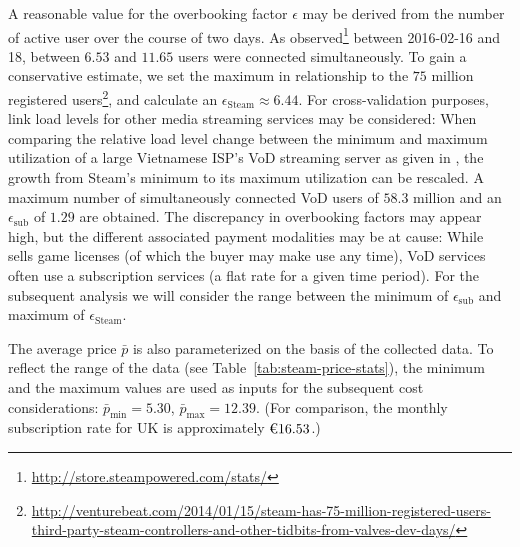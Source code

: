 

A reasonable value for the overbooking factor $\epsilon$ may be derived from the number of active \steam user over the course of two days. As observed\footnote{\url{http://store.steampowered.com/stats/}} between 2016-02-16 and 18, between $6.53$\si{\mega} and $11.65$\si{\mega} users were connected simultaneously. To gain a conservative estimate, we set the maximum in relationship to the $75$ million registered \steam users\footnote{\url{http://venturebeat.com/2014/01/15/steam-has-75-million-registered-users-third-party-steam-controllers-and-other-tidbits-from-valves-dev-days/}}, and calculate an $\epsilon_{\text{Steam}}\approx6.44$. For cross-validation purposes, link load levels for other media streaming services may be considered: When comparing the relative load level change between the minimum and maximum utilization of a large Vietnamese \acrshort{ISP}'s \gls{VoD} streaming server as given in \cite{thanh2012enabling}%
, the growth from Steam's minimum to its maximum utilization can be rescaled. A maximum number of simultaneously connected \gls{VoD} users of $58.3$ million and an $\epsilon_{\text{sub}}$ of $1.29$ are obtained. The discrepancy in overbooking factors may appear high, but the different associated payment modalities may be at cause: While \steam sells game licenses (of which the buyer may make use any time), \gls{VoD} services often use a subscription services (a flat rate for a given time period). For the subsequent analysis we will consider the range between the minimum of $\epsilon_{\text{sub}}$ and maximum of $\epsilon_{\text{Steam}}$.

The average price $\bar{p}$ is also parameterized on the basis of the collected \steam data. %
To reflect the range of the data (see Table~\ref{tab:steam-price-stats}), the minimum and the maximum values are used as inputs for the subsequent cost considerations: $\bar{p}_{\text{min}} = 5.30$, $\bar{p}_{\text{max}} = 12.39$. (For comparison, the monthly subscription rate for \psnow UK is approximately $\text{\texteuro} 16.53$.)

